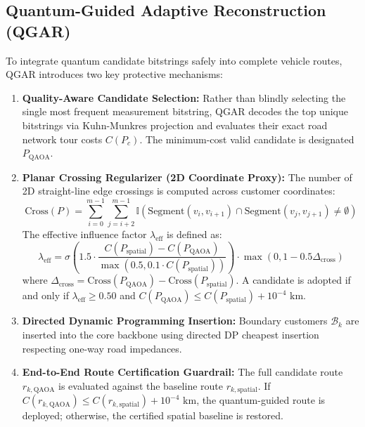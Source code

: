 \documentclass[journal,10pt]{IEEEtran}
\begin{document}
\subsection{Quantum-Guided Adaptive Reconstruction (QGAR)}
To integrate quantum candidate bitstrings safely into complete vehicle routes, QGAR introduces two key protective mechanisms:
\begin{enumerate}
    \item \textbf{Quality-Aware Candidate Selection:} Rather than blindly selecting the single most frequent measurement bitstring, QGAR decodes the top unique bitstrings via Kuhn-Munkres projection \cite{kuhn1955hungarian} and evaluates their exact road network tour costs $C(P_c)$. The minimum-cost valid candidate is designated $P_{\text{QAOA}}$.
    \item \textbf{Planar Crossing Regularizer (2D Coordinate Proxy):} The number of 2D straight-line edge crossings is computed across customer coordinates:
    \begin{equation}
    \text{Cross}(P) = \sum_{i=0}^{m-1} \sum_{j=i+2}^{m-1} \mathbb{I}(\text{Segment}(v_i, v_{i+1}) \cap \text{Segment}(v_j, v_{j+1}) \ne \emptyset)
    \end{equation}
    The effective influence factor $\lambda_{\text{eff}}$ is defined as:
    \begin{equation}
    \label{eq:lambda}
    \lambda_{\text{eff}} = \sigma\left(1.5 \cdot \frac{C(P_{\text{spatial}}) - C(P_{\text{QAOA}})}{\max(0.5, 0.1 \cdot C(P_{\text{spatial}}))}\right) \cdot \max(0, 1 - 0.5 \Delta_{\text{cross}})
    \end{equation}
    where $\Delta_{\text{cross}} = \text{Cross}(P_{\text{QAOA}}) - \text{Cross}(P_{\text{spatial}})$. A candidate is adopted if and only if $\lambda_{\text{eff}} \ge 0.50$ and $C(P_{\text{QAOA}}) \le C(P_{\text{spatial}}) + 10^{-4}\text{ km}$.
    \item \textbf{Directed Dynamic Programming Insertion:} Boundary customers $\mathcal{B}_k$ are inserted into the core backbone using directed DP cheapest insertion respecting one-way road impedances.
    \item \textbf{End-to-End Route Certification Guardrail:} The full candidate route $r_{k, \text{QAOA}}$ is evaluated against the baseline route $r_{k, \text{spatial}}$. If $C(r_{k, \text{QAOA}}) \le C(r_{k, \text{spatial}}) + 10^{-4}\text{ km}$, the quantum-guided route is deployed; otherwise, the certified spatial baseline is restored.
\end{enumerate}
\end{document}
